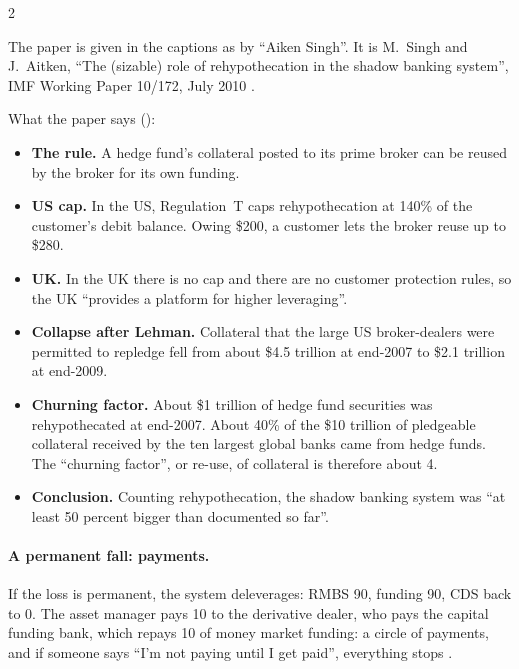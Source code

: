 \begin{paracol}{2}
\begin{coursenote}
The paper is given in the captions as by ``Aiken Singh''. It is M.~Singh and J.~Aitken, ``The (sizable) role of rehypothecation in the shadow banking system'', IMF
Working Paper 10/172, July 2010 .
\end{coursenote}

\begin{reading}
What the paper says ():
\begin{itemize}
  \item \textbf{The rule.} A hedge fund's collateral posted to its prime broker can be reused by the broker for its own funding.
  \item \textbf{US cap.} In the US, Regulation~T caps rehypothecation at 140\% of the customer's debit balance. Owing \$200, a customer lets the broker reuse up to \$280.
  \item \textbf{UK.} In the UK there is no cap and there are no customer protection rules, so the UK ``provides a platform for higher leveraging''.
  \item \textbf{Collapse after Lehman.} Collateral that the large US broker-dealers were permitted to repledge fell from about \$4.5 trillion at end-2007 to \$2.1 trillion at end-2009.
  \item \textbf{Churning factor.} About \$1 trillion of hedge fund securities was rehypothecated at end-2007. About 40\% of the \$10 trillion of pledgeable collateral received by the ten largest global banks came from hedge funds. The ``churning factor'', or re-use, of collateral is therefore about 4.
  \item \textbf{Conclusion.} Counting rehypothecation, the shadow banking system was ``at least 50 percent bigger than documented so far''.
\end{itemize}
\end{reading}

\paragraph{A permanent fall: payments.} If the loss is permanent, the system deleverages: RMBS 90, funding 90, CDS back to 0. The asset manager pays 10 to the derivative
dealer, who pays the capital funding bank, which repays 10 of money market funding: a circle of payments, and if someone says ``I'm not paying until I get paid'',
everything stops .


\end{paracol}
